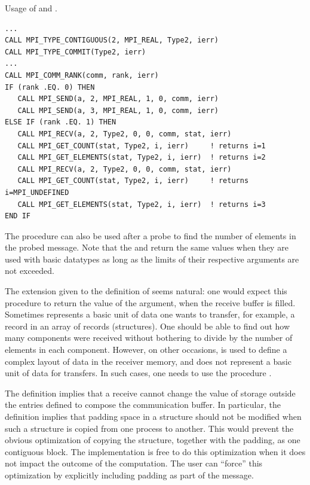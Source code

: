 \begin{example}
\label{pt2pt-exBB}
%
Usage of  and
.
\begin{lstlisting}[language={[MPI]Fortran},basicstyle=\lstsmall]
...
CALL MPI_TYPE_CONTIGUOUS(2, MPI_REAL, Type2, ierr)
CALL MPI_TYPE_COMMIT(Type2, ierr)
...
CALL MPI_COMM_RANK(comm, rank, ierr)
IF (rank .EQ. 0) THEN
   CALL MPI_SEND(a, 2, MPI_REAL, 1, 0, comm, ierr)
   CALL MPI_SEND(a, 3, MPI_REAL, 1, 0, comm, ierr)
ELSE IF (rank .EQ. 1) THEN
   CALL MPI_RECV(a, 2, Type2, 0, 0, comm, stat, ierr)
   CALL MPI_GET_COUNT(stat, Type2, i, ierr)     ! returns i=1
   CALL MPI_GET_ELEMENTS(stat, Type2, i, ierr)  ! returns i=2
   CALL MPI_RECV(a, 2, Type2, 0, 0, comm, stat, ierr)
   CALL MPI_GET_COUNT(stat, Type2, i, ierr)     ! returns i=MPI_UNDEFINED
   CALL MPI_GET_ELEMENTS(stat, Type2, i, ierr)  ! returns i=3
END IF
\end{lstlisting}
\end{example}

The procedure 
can also be used after a probe
to find the number of elements in the probed message.
Note that the
 and
return the same values when they are used
with basic datatypes as long as the limits of their respective  arguments are not exceeded.


\begin{rationale}
The extension given to the definition of  seems
natural: one would expect this procedure to return the value of the
 argument, when the receive buffer is filled.
Sometimes  represents
a basic unit of data one wants to transfer,
for example, a record in an array of records (structures).
One should be able to find out how many components were received
without bothering to divide by the number of elements in each
component.   However, on other occasions,  is used to
define a complex layout of data in the receiver memory, and does not represent
a basic unit of data for transfers.  In such cases, one needs to use
the procedure .
\end{rationale}

\begin{implementors}
The definition implies that a receive cannot change the value of
storage outside the entries defined to compose the communication
buffer.
In particular, the definition implies that padding space in a structure
should not be modified when such a structure is copied from one process to
another. This would
prevent the obvious optimization of copying the structure, together
with the padding, as one contiguous block.
The implementation is free to do this optimization when it does not
impact the outcome of the computation.
The user can ``force'' this optimization by explicitly including
padding as part of the message.
\end{implementors}

